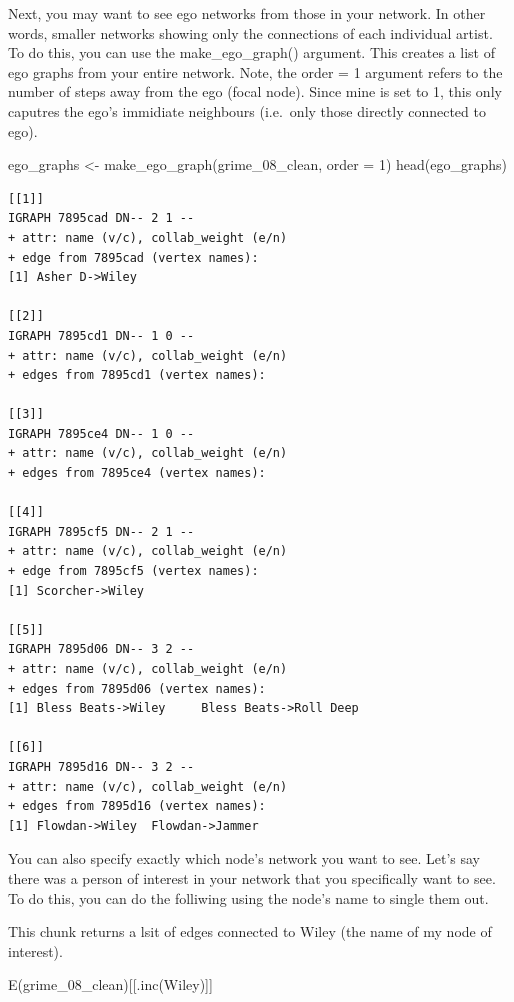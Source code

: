 \documentclass[
  letterpaper,
  DIV=11,
  numbers=noendperiod]{scrreprt}
\newenvironment{Shaded}{\begin{snugshade}}{\end{snugshade}}
\newcommand{\AttributeTok}[1]{\textcolor[rgb]{0.40,0.45,0.13}{#1}}
\newcommand{\DecValTok}[1]{\textcolor[rgb]{0.68,0.00,0.00}{#1}}
\newcommand{\FunctionTok}[1]{\textcolor[rgb]{0.28,0.35,0.67}{#1}}
\newcommand{\NormalTok}[1]{\textcolor[rgb]{0.00,0.23,0.31}{#1}}
\newcommand{\OtherTok}[1]{\textcolor[rgb]{0.00,0.23,0.31}{#1}}
\newcommand{\StringTok}[1]{\textcolor[rgb]{0.13,0.47,0.30}{#1}}
\begin{document}
Next, you may want to see ego networks from those in your network. In
other words, smaller networks showing only the connections of each
individual artist. To do this, you can use the make\_ego\_graph()
argument. This creates a list of ego graphs from your entire network.
Note, the order = 1 argument refers to the number of steps away from the
ego (focal node). Since mine is set to 1, this only caputres the ego's
immidiate neighbours (i.e.~only those directly connected to ego).

\begin{Shaded}
\begin{Highlighting}[]
\NormalTok{ego\_graphs }\OtherTok{\textless{}{-}} \FunctionTok{make\_ego\_graph}\NormalTok{(grime\_08\_clean, }\AttributeTok{order =} \DecValTok{1}\NormalTok{)}
\FunctionTok{head}\NormalTok{(ego\_graphs)}
\end{Highlighting}
\end{Shaded}

\begin{verbatim}
[[1]]
IGRAPH 7895cad DN-- 2 1 -- 
+ attr: name (v/c), collab_weight (e/n)
+ edge from 7895cad (vertex names):
[1] Asher D->Wiley

[[2]]
IGRAPH 7895cd1 DN-- 1 0 -- 
+ attr: name (v/c), collab_weight (e/n)
+ edges from 7895cd1 (vertex names):

[[3]]
IGRAPH 7895ce4 DN-- 1 0 -- 
+ attr: name (v/c), collab_weight (e/n)
+ edges from 7895ce4 (vertex names):

[[4]]
IGRAPH 7895cf5 DN-- 2 1 -- 
+ attr: name (v/c), collab_weight (e/n)
+ edge from 7895cf5 (vertex names):
[1] Scorcher->Wiley

[[5]]
IGRAPH 7895d06 DN-- 3 2 -- 
+ attr: name (v/c), collab_weight (e/n)
+ edges from 7895d06 (vertex names):
[1] Bless Beats->Wiley     Bless Beats->Roll Deep

[[6]]
IGRAPH 7895d16 DN-- 3 2 -- 
+ attr: name (v/c), collab_weight (e/n)
+ edges from 7895d16 (vertex names):
[1] Flowdan->Wiley  Flowdan->Jammer
\end{verbatim}

You can also specify exactly which node's network you want to see. Let's
say there was a person of interest in your network that you specifically
want to see. To do this, you can do the folliwing using the node's name
to single them out.

This chunk returns a lsit of edges connected to Wiley (the name of my
node of interest).

\begin{Shaded}
\begin{Highlighting}[]
\FunctionTok{E}\NormalTok{(grime\_08\_clean)[[}\FunctionTok{.inc}\NormalTok{(}\StringTok{\textquotesingle{}Wiley\textquotesingle{}}\NormalTok{)]]}
\end{Highlighting}
\end{Shaded}
\end{document}
